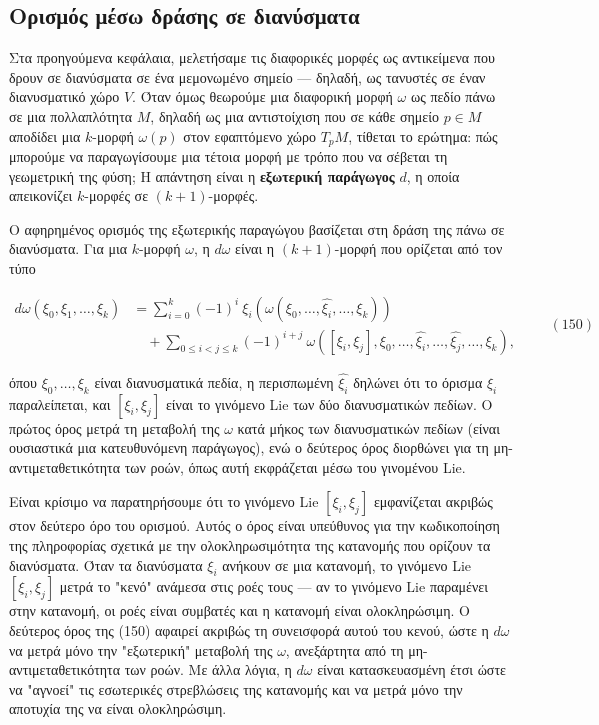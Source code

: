 \documentclass[12pt]{article}
\begin{document}
\subsection{Ορισμός μέσω δράσης σε διανύσματα}

Στα προηγούμενα κεφάλαια, μελετήσαμε τις διαφορικές μορφές ως αντικείμενα που δρουν σε διανύσματα σε ένα μεμονωμένο σημείο — δηλαδή, ως τανυστές σε έναν διανυσματικό χώρο $V$. Όταν όμως θεωρούμε μια διαφορική μορφή $\omega$ ως πεδίο πάνω σε μια πολλαπλότητα $M$, δηλαδή ως μια αντιστοίχιση που σε κάθε σημείο $p \in M$ αποδίδει μια $k$-μορφή $\omega(p)$ στον εφαπτόμενο χώρο $T_pM$, τίθεται το ερώτημα: πώς μπορούμε να παραγωγίσουμε μια τέτοια μορφή με τρόπο που να σέβεται τη γεωμετρική της φύση; Η απάντηση είναι η \textbf{εξωτερική παράγωγος} $d$, η οποία απεικονίζει $k$-μορφές σε $(k+1)$-μορφές.

Ο αφηρημένος ορισμός της εξωτερικής παραγώγου βασίζεται στη δράση της πάνω σε διανύσματα. Για μια $k$-μορφή $\omega$, η $d\omega$ είναι η $(k+1)$-μορφή που ορίζεται από τον τύπο

\[
\begin{aligned}
d\omega(\xi_0, \xi_1, \dots, \xi_k) &= \sum_{i=0}^{k} (-1)^i \ \xi_i \left( \omega(\xi_0, \dots, \widehat{\xi_i}, \dots, \xi_k) \right) \\
&\quad + \sum_{0 \le i < j \le k} (-1)^{i+j} \ \omega([\xi_i, \xi_j], \xi_0, \dots, \widehat{\xi_i}, \dots, \widehat{\xi_j}, \dots, \xi_k),
\end{aligned} \qquad (150)
\]

όπου $\xi_0, \dots, \xi_k$ είναι διανυσματικά πεδία, η περισπωμένη $\widehat{\xi_i}$ δηλώνει ότι το όρισμα $\xi_i$ παραλείπεται, και $[\xi_i, \xi_j]$ είναι το γινόμενο Lie των δύο διανυσματικών πεδίων. Ο πρώτος όρος μετρά τη μεταβολή της $\omega$ κατά μήκος των διανυσματικών πεδίων (είναι ουσιαστικά μια κατευθυνόμενη παράγωγος), ενώ ο δεύτερος όρος διορθώνει για τη μη-αντιμεταθετικότητα των ροών, όπως αυτή εκφράζεται μέσω του γινομένου Lie.

Είναι κρίσιμο να παρατηρήσουμε ότι το γινόμενο Lie $[\xi_i, \xi_j]$ εμφανίζεται ακριβώς στον δεύτερο όρο του ορισμού. Αυτός ο όρος είναι υπεύθυνος για την κωδικοποίηση της πληροφορίας σχετικά με την ολοκληρωσιμότητα της κατανομής που ορίζουν τα διανύσματα. Όταν τα διανύσματα $\xi_i$ ανήκουν σε μια κατανομή, το γινόμενο Lie $[\xi_i, \xi_j]$ μετρά το "κενό" ανάμεσα στις ροές τους — αν το γινόμενο Lie παραμένει στην κατανομή, οι ροές είναι συμβατές και η κατανομή είναι ολοκληρώσιμη. Ο δεύτερος όρος της (150) αφαιρεί ακριβώς τη συνεισφορά αυτού του κενού, ώστε η $d\omega$ να μετρά μόνο την "εξωτερική" μεταβολή της $\omega$, ανεξάρτητα από τη μη-αντιμεταθετικότητα των ροών. Με άλλα λόγια, η $d\omega$ είναι κατασκευασμένη έτσι ώστε να "αγνοεί" τις εσωτερικές στρεβλώσεις της κατανομής και να μετρά μόνο την αποτυχία της να είναι ολοκληρώσιμη.
\end{document}
